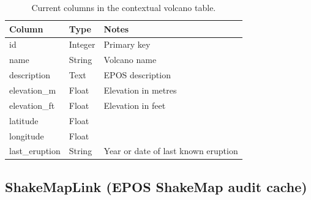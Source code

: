 \documentclass[12pt]{article}
\begin{document}
\begin{table}[H]
\centering
\caption{Current columns in the contextual volcano table.}
\footnotesize
\setlength{\tabcolsep}{3pt}
\begin{tabular}{>{\raggedright\arraybackslash}p{3.1cm}>{\raggedright\arraybackslash}p{2.0cm}>{\raggedright\arraybackslash}p{8.6cm}}
\hline
\textbf{Column} & \textbf{Type} & \textbf{Notes} \\
\hline
id            & Integer & Primary key \\
name          & String  & Volcano name \\
description   & Text    & EPOS description \\
elevation\_m  & Float   & Elevation in metres \\
elevation\_ft & Float   & Elevation in feet \\
latitude      & Float   & \\
longitude     & Float   & \\
last\_eruption & String & Year or date of last known eruption \\
\hline
\end{tabular}
\end{table}

\subsection*{ShakeMapLink (EPOS ShakeMap audit cache)}
\end{document}
